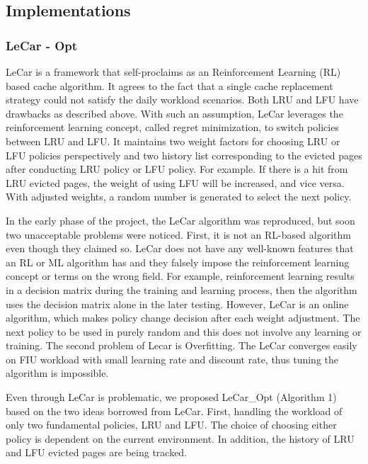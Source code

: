 \documentclass[letterpaper,twocolumn,10pt]{article}
\begin{document}
\subsection{Implementations}

\subsubsection{LeCar - Opt}

LeCar\cite{vietri2018driving} is a framework that self-proclaims as an Reinforcement Learning (RL) based cache algorithm. It agrees to the fact that a single cache replacement strategy could not satisfy the daily workload scenarios. Both LRU and LFU have drawbacks as described above. With such an assumption, LeCar leverages the reinforcement learning concept, called regret minimization, to switch policies between LRU and LFU. It maintains two weight factors for choosing LRU or LFU policies perspectively and two history list corresponding to the evicted pages after conducting LRU policy or LFU policy. For example. If there is a hit from LRU evicted pages, the weight of using LFU will be increased, and vice versa. With adjusted weights, a random number is generated to select the next policy. 

In the early phase of the project, the LeCar algorithm was reproduced, but soon two unacceptable problems were noticed. First, it is not an RL-based algorithm even though they claimed so. LeCar does not have any well-known features that an RL or ML algorithm has and they falsely impose the reinforcement learning concept or terms on the wrong field. For example, reinforcement learning results in a decision matrix during the training and learning process, then the algorithm uses the decision matrix alone in the later testing. However, LeCar is an online algorithm, which makes policy change decision after each weight adjustment. The next policy to be used in purely random and this does not involve any learning or training. The second problem of Lecar is Overfitting. The LeCar converges easily on FIU workload with small learning rate and discount rate, thus tuning the algorithm is impossible. 

Even through LeCar is problematic, we proposed LeCar\_Opt (Algorithm 1) based on the two ideas borrowed from LeCar. First, handling the workload of only two fundamental policies, LRU and LFU. The choice of choosing either policy is dependent on the current environment. In addition, the history of LRU and LFU evicted pages are being tracked. 
\end{document}
